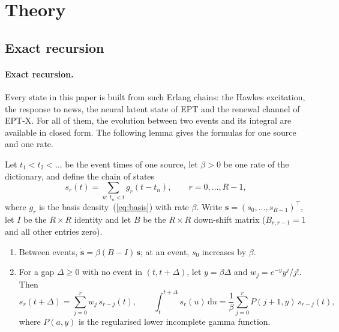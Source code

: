 \section{Theory}\label{sec:theory}

\subsection{Exact recursion}
\paragraph{Exact recursion.} Every state in this paper is built from such Erlang chains: the
Hawkes excitation, the response to news, the neural latent state of EPT and the renewal channel of
EPT-X. For all of them, the evolution between two events and its integral are available in closed
form. The following lemma gives the formulas for one source and one rate.

\begin{lemma}\label{lem:recursion}
Let $t_1<t_2<\dots$ be the event times of one source, let $\beta>0$ be one rate of the
dictionary, and define the chain of states
\[
s_r(t)=\sum_{n:\,t_n<t} g_r(t-t_n),\qquad r=0,\dots,R-1,
\]
where $g_r$ is the basis density~(\ref{eq:basis}) with rate $\beta$. Write
$\bm s=(s_0,\dots,s_{R-1})^\top$, let $I$ be the $R\times R$ identity and let $B$ be the
$R\times R$ down-shift matrix ($B_{r,r-1}=1$ and all other entries zero).
\begin{enumerate}
\item Between events, $\dot{\bm s}=\beta(B-I)\,\bm s$; at an event, $s_0$ increases by $\beta$.
\item For a gap $\Delta\ge0$ with no event in $(t,t+\Delta)$, let $y=\beta\Delta$ and
$w_j=e^{-y}y^j/j!$. Then
\[
s_r(t+\Delta)=\sum_{j=0}^{r}w_j\,s_{r-j}(t),\qquad
\int_t^{t+\Delta}s_r(u)\,\mathrm{d}u=\frac{1}{\beta}\sum_{j=0}^{r}P(j+1,y)\,s_{r-j}(t),
\]
where $P(a,y)$ is the regularised lower incomplete gamma function.
\end{enumerate}
\end{lemma}

